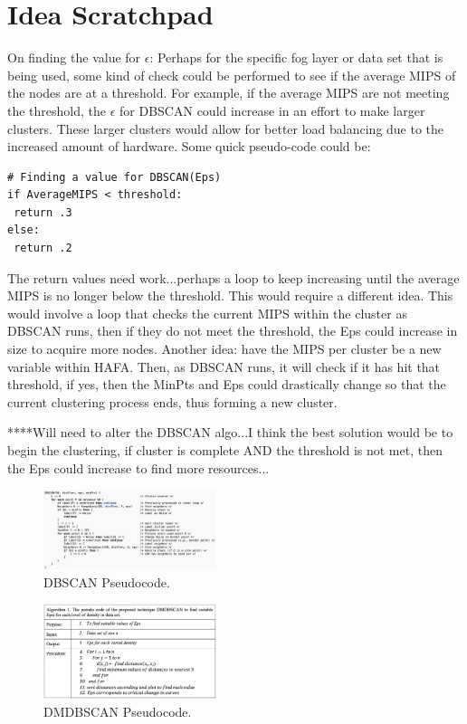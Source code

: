 \documentclass[letterpaper,twocolumn,10pt]{article}
\begin{document}
\section{Idea Scratchpad}
On finding the value for $\epsilon$:
Perhaps for the specific fog layer or data set that is being used, some kind of check could be performed to see if the average MIPS of the nodes are at a threshold. For example, if the average MIPS are not meeting the threshold, the $\epsilon$ for DBSCAN could increase in an effort to make larger clusters. These larger clusters would allow for better load balancing due to the increased amount of hardware. Some quick pseudo-code could be:
\begin{verbatim}
# Finding a value for DBSCAN(Eps)
if AverageMIPS < threshold:
 return .3
else:
 return .2
\end{verbatim}
 The return values need work...perhaps a loop to keep increasing until the average MIPS is no longer below the threshold. This would require a different idea. This would involve a loop that checks the current MIPS within the cluster as DBSCAN runs, then if they do not meet the threshold, the Eps could increase in size to acquire more nodes. Another idea: have the MIPS per cluster be a new variable within HAFA. Then, as DBSCAN runs, it will check if it has hit that threshold, if yes, then the MinPts and Eps could drastically change so that the current clustering process ends, thus forming a new cluster.
 
 ****Will need to alter the DBSCAN algo...I think the best solution would be to begin the clustering, if cluster is complete AND the threshold is not met, then the Eps could increase to find more resources...

\begin{figure}[h]
\centering
\includegraphics[width=0.45\textwidth]{pseudocode}
\caption{\label{fig:pseudocode}DBSCAN Pseudocode.}
\end{figure}

\begin{figure}[h]
\centering
\includegraphics[width=0.45\textwidth]{dmdbscan}
\caption{\label{fig:dmdbscan}DMDBSCAN Pseudocode.}
\end{figure}



\end{document}
